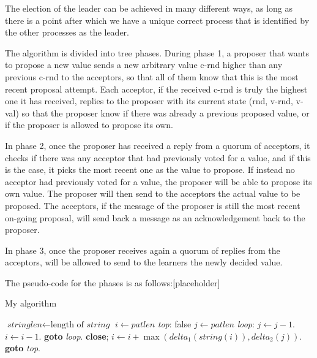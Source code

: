 The election of the leader can be achieved in many different ways, as long as there is a point after which we have a unique correct process that is identified by the other processes as the leader.

The algorithm is divided into tree phases. During phase 1, a proposer that wants to propose a new value sends a new arbitrary value c-rnd higher than any previous c-rnd to the acceptors, so that all of them know that this is the most recent proposal attempt. Each acceptor, if the received c-rnd is truly the highest one it has received, replies to the proposer with its current state (rnd, v-rnd, v-val) so that the proposer know if there was already a previous proposed value, or if the proposer is allowed to propose its own.

In phase 2, once the proposer has received a reply from a quorum of acceptors, it checks if there was any acceptor that had previously voted for a value, and if this is the case, it picks the most recent one as the value to propose. If instead no acceptor had previously voted for a value, the proposer will be able to propose its own value. The proposer will then send to the acceptors the actual value to be proposed.
The acceptors, if the message of the proposer is still the most recent on-going proposal, will send back a message as an acknowledgement back to the proposer.

In phase 3, once the proposer receives again a quorum of replies from the acceptors, will be allowed to send to the learners the newly decided value.

The pseudo-code for the phases is as follows:[placeholder]
\def\BState{\State\hskip-\ALG@thistlm}
\begin{algorithm}
  \caption{My algorithm}\label{euclid}
  \begin{algorithmic}[1]
  \State $\textit{stringlen} \gets \text{length of }\textit{string}$
  \State $i \gets \textit{patlen}$
  \State \emph{top}:
   \Return false
  \EndIf
  \State $j \gets \textit{patlen}$
  \State \emph{loop}:
  \State $j \gets j-1$.
  \State $i \gets i-1$.
  \State \textbf{goto} \emph{loop}.
  \State \textbf{close};
  \EndIf
  \State $i \gets i+\max(\textit{delta}_1(\textit{string}(i)),\textit{delta}_2(j))$.
  \State \textbf{goto} \emph{top}.
  \EndProcedure
  \end{algorithmic}
  \end{algorithm}

